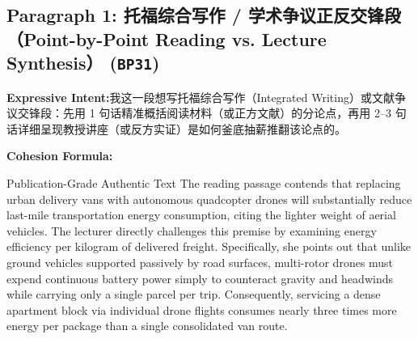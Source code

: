 \subsection*{Paragraph 1: 托福综合写作 / 学术争议正反交锋段（Point-by-Point Reading vs. Lecture Synthesis） (\texttt{BP31})}
\noindent\textbf{Expressive Intent:}\enspace 我这一段想写托福综合写作（Integrated Writing）或文献争议交锋段：先用 1 句话精准概括阅读材料（或正方文献）的分论点，再用 2--3 句话详细呈现教授讲座（或反方实证）是如何釜底抽薪推翻该论点的。\par
\noindent\textbf{Cohesion Formula:}\par\vspace{4pt}
\begin{ExampleBox}{Publication-Grade Authentic Text}
The reading passage contends that replacing urban delivery vans with autonomous quadcopter drones will substantially reduce last-mile transportation energy consumption, citing the lighter weight of aerial vehicles. The lecturer directly challenges this premise by examining energy efficiency per kilogram of delivered freight. Specifically, she points out that unlike ground vehicles supported passively by road surfaces, multi-rotor drones must expend continuous battery power simply to counteract gravity and headwinds while carrying only a single parcel per trip. Consequently, servicing a dense apartment block via individual drone flights consumes nearly three times more energy per package than a single consolidated van route.
\end{ExampleBox}
